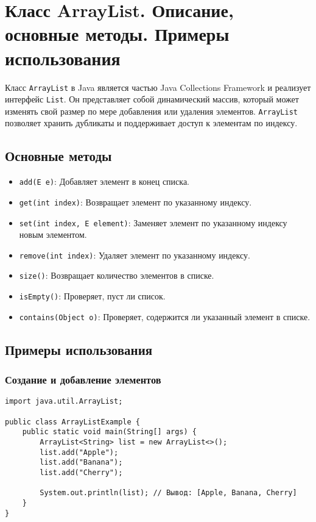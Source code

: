 \documentclass[12pt, a4paper]{article}
\begin{document}
\section{Класс ArrayList. Описание, основные методы. Примеры использования}
Класс \texttt{ArrayList} в Java является частью Java Collections Framework и реализует интерфейс \texttt{List}. Он представляет собой динамический массив, который может изменять свой размер по мере добавления или удаления элементов. \texttt{ArrayList} позволяет хранить дубликаты и поддерживает доступ к элементам по индексу.

\subsection*{Основные методы}
\begin{itemize}
    \item \texttt{add(E e)}: Добавляет элемент в конец списка.
    \item \texttt{get(int index)}: Возвращает элемент по указанному индексу.
    \item \texttt{set(int index, E element)}: Заменяет элемент по указанному индексу новым элементом.
    \item \texttt{remove(int index)}: Удаляет элемент по указанному индексу.
    \item \texttt{size()}: Возвращает количество элементов в списке.
    \item \texttt{isEmpty()}: Проверяет, пуст ли список.
    \item \texttt{contains(Object o)}: Проверяет, содержится ли указанный элемент в списке.
\end{itemize}

\subsection*{Примеры использования}

\subsubsection*{Создание и добавление элементов}
\begin{verbatim}
import java.util.ArrayList;

public class ArrayListExample {
    public static void main(String[] args) {
        ArrayList<String> list = new ArrayList<>();
        list.add("Apple");
        list.add("Banana");
        list.add("Cherry");

        System.out.println(list); // Вывод: [Apple, Banana, Cherry]
    }
}
\end{verbatim}
\end{document}
